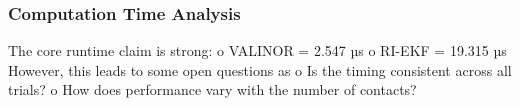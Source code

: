 \subsubsection{Computation Time Analysis}

\begin{revquote}
The core runtime claim is strong:
      o VALINOR = 2.547 µs
      o RI-EKF = 19.315 µs
However, this leads to some open questions as
      o Is the timing consistent across all trials?
      o How does performance vary with the number of contacts?
    
\end{revquote}